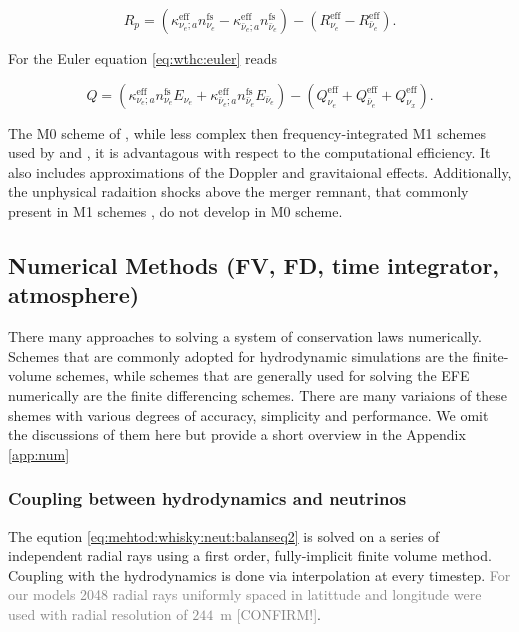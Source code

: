 \documentclass[11pt,a4paper,headinclude=true,DIV=14,BCOR=8mm,chapterprefix,listof=totoc,twoside,openright,abstracton]{scrbook}
\newcommand{\gray}[1]{\textcolor{gray}{#1}}
\begin{document}
\begin{equation}
R_p = (\kappa_{\nu_e;a}^{\text{eff}}n_{\nu_e}^{\text{fs}} - \kappa_{\bar{\nu}_e;a}^{\text{eff}}n_{\bar{\nu}_e}^{\text{fs}}) - (R_{\nu_e}^{\text{eff}} - R_{\bar{\nu}_e}^{\text{eff}}).
\end{equation}

For the Euler equation \eqref{eq:wthc:euler} reads

\begin{equation}
Q = (\kappa_{\nu_e;a}^{\text{eff}}n_{\nu_e}^{\text{fs}}E_{\nu_e} + 
\kappa_{\bar{\nu}_e;a}^{\text{eff}}n_{\bar{\nu}_e}^{\text{fs}}E_{\bar{\nu}_e}) - 
(Q_{\nu_e}^{\text{eff}} + Q_{\bar{\nu}_e}^{\text{eff}} + Q_{\nu_x}^{\text{eff}}).
\end{equation}

The M0 scheme of \cite{Radice:2016dwd}, while less complex then frequency-integrated M1 schemes used by 
\cite{Sekiguchi:2015dma} and \cite{Foucart:2015vpa}, it is advantagous with respect to the computational efficiency.
It also includes approximations of the Doppler and gravitaional effects. 
Additionally, the unphysical radaition shocks above the merger remnant, that commonly present in M1 schemes \cite{Foucart:2018gis}, do not develop in M0 scheme.




\subsection{Numerical Methods (FV, FD, time integrator, atmosphere)}


There many approaches to solving a system of conservation laws numerically.
Schemes that are commonly adopted for hydrodynamic simulations are the finite-volume schemes, while schemes that are generally used for solving the EFE numerically are the finite differencing schemes. There are many variaions of these shemes with various degrees of accuracy, simplicity and performance. We omit the discussions of them here but provide a short overview in the Appendix \ref{app:num}


\subsubsection{Coupling between hydrodynamics and neutrinos}


The eqution \eqref{eq:mehtod:whisky:neut:balanseq2} is solved on a series of independent radial rays using a first order, fully-implicit finite volume method.
Coupling with the hydrodynamics is done via interpolation at every timestep.
\gray{For our models 2048 radial rays uniformly spaced in latittude and longitude were used with radial resolution of $244$~m [CONFIRM!]}.
\end{document}
